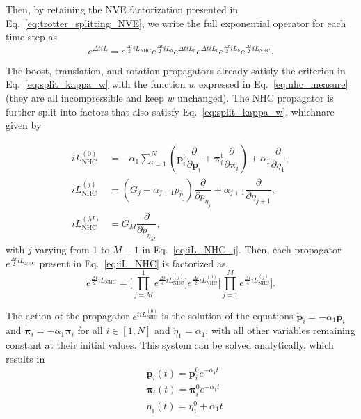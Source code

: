 \documentclass[aip,jcp,reprint,amsmath,amssymb]{revtex4-1}
\newcommand{\vt}[1]{\boldsymbol{\mathbf{#1}}}           %
\newcommand{\tr}[1]{#1^\text{t}}                        %
\newcommand{\diff}[2]{\dfrac{\partial #1}{\partial #2}} %
\begin{document}
Then, by retaining the NVE factorization presented in Eq.~\eqref{eq:trotter_splitting_NVE}, we write the full exponential operator for each time step as
\begin{equation}
\label{eq:trotter_splitting_NHC}
e^{\Delta t i\!L} = e^{\frac{\Delta t}{2} i\!L_\text{NHC}} e^{\frac{\Delta t}{2} i\!L_b} e^{\Delta t i\!L_r} e^{\Delta t i\!L_t}  e^{\frac{\Delta t}{2} i\!L_b} e^{\frac{\Delta t}{2} i\!L_\text{NHC}}.
\end{equation}

The boost, translation, and rotation propagators already satisfy the criterion in Eq.~\eqref{eq:split_kappa_w} with the function $w$ expressed in Eq.~\eqref{eq:nhc_measure} (they are all incompressible and keep $w$ unchanged). The NHC propagator is further split into factors that also satisfy Eq.~\eqref{eq:split_kappa_w}, whichnare given by

\begin{subequations}
\begin{align}
i\!L_\text{NHC}^{(0)} &= -\alpha_1 \sum_{i=1}^N \left( \tr{\vt p}_i \diff{}{\vt p_i} + \tr{\vt \pi}_i \diff{}{\vt \pi_i}\right) + \alpha_1 \diff{}{\eta_1}, \\
i\!L_\text{NHC}^{(j)} &= (G_j - \alpha_{j+1} p_{\eta_j}) \diff{}{p_{\eta_j}} + \alpha_{j+1} \diff{}{\eta_{j+1}}, \label{eq:iL_NHC_j} \\
i\!L_\text{NHC}^{(M)} &= G_M \diff{}{p_{\eta_M}},
\end{align}
\end{subequations}
with $j$ varying from $1$ to $M-1$ in Eq.~\eqref{eq:iL_NHC_j}. Then, each propagator $e^{\frac{\Delta t}{2} i\!L_\text{NHC}}$ present in Eq.~\eqref{eq:iL_NHC} is factorized as
\[
e^{\frac{\Delta t}{2} i\!L_\text{NHC}} = \Bigg[ \prod_{j=M}^1 e^{\frac{\Delta t}{4} i\!L_\text{NHC}^{(j)} } \Bigg] e^{\frac{\Delta t}{2} i\!L_\text{NHC}^{(0)} } \Bigg[ \prod_{j=1}^M e^{\frac{\Delta t}{4} i\!L_\text{NHC}^{(j)} } \Bigg].
\]

The action of the propagator $e^{t i\!L_\text{NHC}^{(0)}}$ is the solution of the equations $\dot{\vt p}_i = -\alpha_1 \vt p_i$ and $\dot{\vt \pi}_i = -\alpha_1 \vt \pi_i$ for all $i \in [1,N]$ and $\dot{\eta}_1 = \alpha_1$, with all other variables remaining constant at their initial values. This system can be solved analytically, which results in
\begin{align*}
&\vt p_i(t) = \vt p_i^0 e^{-\alpha_1 t} \\
&\vt \pi_i(t) = \vt \pi_i^0 e^{-\alpha_1 t} \\
&\eta_1(t) = \eta_1^0 + \alpha_1 t
\end{align*}
\end{document}

